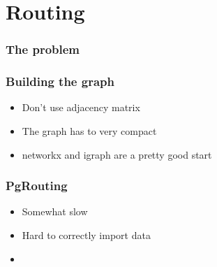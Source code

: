 \documentclass[14pt]{beamer}
\begin{document}
\section{Routing}

\begin{frame}
  \frametitle{The problem}
\end{frame}

\begin{frame}
  \frametitle{Building the graph}
  \begin{itemize}
  \item Don't use adjacency matrix
  \item The graph has to very compact
  \item networkx and igraph are a pretty good start
  \end{itemize}
\end{frame}

\begin{frame}
  \frametitle{PgRouting}
  \begin{itemize}
  \item Somewhat slow
  \item Hard to correctly import data
  \item
  \end{itemize}
\end{frame}



















\end{document}
